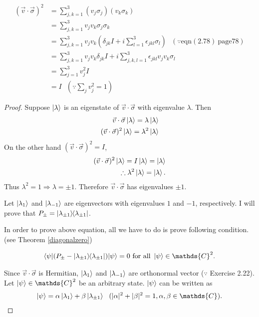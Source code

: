 	\begin{align*}
	(\vec{v} \cdot \vec{\sigma})^2 &= \sum_{j,k=1}^3 (v_j \sigma_j)  (v_k \sigma_k)\\
	&= \sum_{j,k=1}^3 v_j v_k \sigma_j \sigma_k\\
	&= \sum_{j,k=1}^3 v_j v_k \left(\delta_{jk}I + i \sum_{l=1}^3 \epsilon_{jkl}\sigma_l \right) ~~~(\because \text{eqn}(2.78)~ \text{page} 78)\\
	&= \sum_{j,k=1}^3 v_j v_k \delta_{jk}I  + i \sum_{j,k,l=1}^3 \epsilon_{jkl} v_j v_k \sigma_l\\
	&= \sum_{j=1}^3 v_j^2 I\\
	&= I ~~~\left(\because \sum_j v_j^2 = 1 \right)
	\end{align*}


	\begin{proof}
		Suppose $\ket{\lambda}$ is an eigenstate of $\vec{v} \cdot \vec{\sigma}$ with eigenvalue $\lambda$. Then
		\begin{align*}
		\vec{v} \cdot \vec{\sigma} \ket{\lambda} = \lambda \ket{\lambda}\\
		(\vec{v} \cdot \vec{\sigma})^2 \ket{\lambda} = \lambda^2 \ket{\lambda}
		\end{align*}
		On the other hand $(\vec{v} \cdot \vec{\sigma})^2 = I$,
		\begin{align*}
		(\vec{v} \cdot \vec{\sigma})^2 \ket{\lambda} = I \ket{\lambda} = \ket{\lambda}\\
		\therefore \lambda^2\ket{\lambda} = \ket{\lambda}.
		\end{align*}
		Thus $\lambda^2 = 1 \Rightarrow \lambda = \pm 1$. Therefore $\vec{v} \cdot \vec{\sigma}$ has eigenvalues $\pm 1$.

		Let $\ket{\lambda_1}$ and $\ket{\lambda_{-1}}$ are eigenvectors with eigenvalues $1$ and $-1$, respectively.
		I will prove that $P_\pm = \ket{\lambda_{\pm 1}}\hspace{-1mm} \bra{\lambda_{\pm 1}}$.

		In order to prove above equation, all we have to do is prove following condition. (see Theorem \ref{diagonalzero})
		\begin{screen}
			\begin{align}
				\braket{\psi | (P_\pm - \kb{\lambda_{\pm 1}})| \psi} = 0 \text{ for all } \ket{\psi} \in \mathds{C}^2.
			\end{align}
		\end{screen}

		Since $\vec{v} \cdot \vec{\sigma}$ is Hermitian, $\ket{\lambda_1}$ and $\ket{\lambda_{-1}}$ are orthonormal vector ($\because $ Exercise 2.22).
		Let $\ket{\psi} \in \mathds{C}^2$ be an arbitrary state. $\ket{\psi}$ can be written as
		\begin{align*}
		\ket{\psi} = \alpha \ket{\lambda_1} + \beta \ket{\lambda_{\pm 1}} ~~(|\alpha|^2 + |\beta|^2 = 1, \alpha, \beta \in \mathds{C}).
		\end{align*}


\end{proof}
